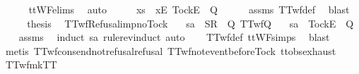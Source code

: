 \begin{isabellebody}
\ \ \ \ \isamarkupfalse%
\ ttWF{\isachardot}elims{\isacharparenleft}{}{\isacharparenright}\ \isamarkupfalse%
\ auto\isanewline
\ \ \isamarkupfalse%
\ \isamarkupfalse%
\ {\isachardoublequoteopen}xs\ {\isacharat}\ {\isacharbrackleft}{\isacharbrackleft}x{}{\isacharbrackright}\isactrlsub E{\isacharcomma}\ {\isacharbrackleft}Tock{\isacharbrackright}\isactrlsub E{\isacharbrackright}\ {\isasymnotin}\ Q{\isachardoublequoteclose}\isanewline
\ \ \ \ \isamarkupfalse%
\ assms\ TTwf{\isacharunderscore}def\ \isamarkupfalse%
\ blast\isanewline
\ \ \isamarkupfalse%
\ \isamarkupfalse%
\ {\isacharquery}thesis\ \isacommand{{\isachardot}}\isamarkupfalse%
\isanewline
{}\isamarkupfalse%
%
\endisatagproof
{\isafoldproof}%
%
\isadelimproof
\isanewline
%
\endisadelimproof
\isanewline
\isanewline
{}\isamarkupfalse%
\ TTwf{\isacharunderscore}Refusal{\isacharunderscore}imp{\isacharunderscore}no{\isacharunderscore}Tock{\isacharcolon}\isanewline
\ \ \ {\isachardoublequoteopen}sa\ {\isacharat}\ {\isacharbrackleft}{\isacharbrackleft}S{\isacharbrackright}\isactrlsub R{\isacharbrackright}\ {\isasymin}\ Q{\isachardoublequoteclose}\ {\isachardoublequoteopen}TTwf{\isacharparenleft}Q{\isacharparenright}{\isachardoublequoteclose}\isanewline
\ \ \ {\isachardoublequoteopen}sa\ {\isacharat}\ {\isacharbrackleft}{\isacharbrackleft}Tock{\isacharbrackright}\isactrlsub E{\isacharbrackright}\ {\isasymnotin}\ Q{\isachardoublequoteclose}\isanewline
%
\isadelimproof
\ \ %
\endisadelimproof
%
\isatagproof
{}\isamarkupfalse%
\ assms\ \isamarkupfalse%
\ {\isacharparenleft}induct\ sa\ rule{\isacharcolon}rev{\isacharunderscore}induct{\isacharcomma}\ auto{\isacharparenright}\isanewline
\ \ \isamarkupfalse%
\ TTwf{\isacharunderscore}def\ ttWF{\isachardot}simps{\isacharparenleft}{}{\isacharparenright}\ \isamarkupfalse%
\ blast\isanewline
\ \ \isamarkupfalse%
\ {\isacharparenleft}metis\ TTwf{\isacharunderscore}cons{\isacharunderscore}end{\isacharunderscore}not{\isacharunderscore}refusal{\isacharunderscore}refusal\ TTwf{\isacharunderscore}not{\isacharunderscore}event{\isacharunderscore}before{\isacharunderscore}Tock\ ttobs{\isachardot}exhaust{\isacharparenright}%
\endisatagproof
{\isafoldproof}%
%
\isadelimproof
\isanewline
%
\endisadelimproof
\isanewline
{}\isamarkupfalse%
\ TTwf{\isacharunderscore}mkTT{}{\isacharcolon}\isanewline

\end{isabellebody}
